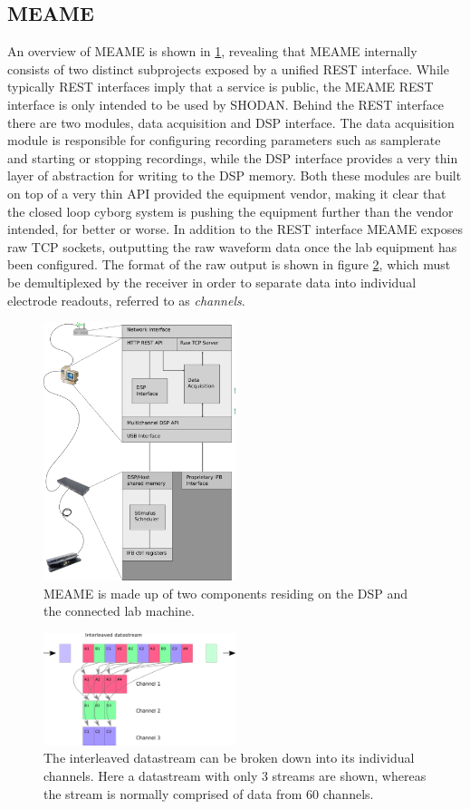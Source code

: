\subsection{MEAME}
An overview of MEAME is shown in \ref{figMEAME}, revealing that MEAME internally
consists of two distinct subprojects exposed by a unified REST interface.
While typically REST interfaces imply that a service is public, the MEAME REST
interface is only intended to be used by SHODAN.
%
Behind the REST interface there are two modules, data acquisition and DSP interface.
%
The data acquisition module is responsible for configuring recording parameters
such as samplerate and starting or stopping recordings, while the DSP interface
provides a very thin layer of abstraction for writing to the DSP memory.
%
Both these modules are built on top of a very thin API provided the equipment
vendor, making it clear that the closed loop cyborg system is pushing the
equipment further than the vendor intended, for better or worse.
%
In addition to the REST interface MEAME exposes raw TCP sockets, outputting the
raw waveform data once the lab equipment has been configured.
%
The format of the raw output is shown in figure \ref{figLayout}, which must be
demultiplexed by the receiver in order to separate data into individual
electrode readouts, referred to as \emph{channels}.
%
\begin{figure}[h!]
  \centering
  \includegraphics[width=0.5\textwidth]{fig/MEAME.png}
  \caption{
    MEAME is made up of two components residing on the DSP and the connected lab
    machine.
  }
  \label{figMEAME}
\end{figure}
\begin{figure}[h!]
  \centering
  \includegraphics[width=0.5\textwidth]{fig/reorder.png}
  \caption{
    The interleaved datastream can be broken down into its individual channels.
    Here a datastream with only 3 streams are shown, whereas the stream is
    normally comprised of data from 60 channels.
  }
  \label{figLayout}
\end{figure}
